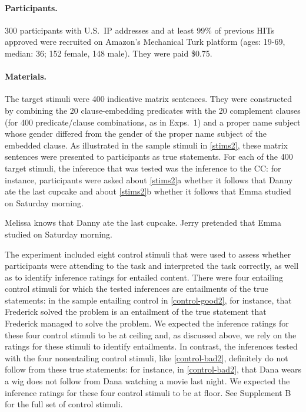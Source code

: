 \documentclass{language}
\newcommand{\6}{\mbox{$[\hspace*{-.6mm}[$}}
\newcommand{\9}{\mbox{$]\hspace*{-.6mm}]$}}
\begin{document}
\paragraph{Participants.} 300 participants with U.S.\ IP addresses and at least 99\% of previous HITs approved were recruited on Amazon's Mechanical Turk platform (ages: 19-69, median: 36; 152 female, 148 male). They were paid \$0.75.

\paragraph{Materials.} The target stimuli were 400 indicative matrix sentences. They were constructed by combining the 20 clause-embedding predicates with the 20 complement clauses (for 400 predicate/clause combinations, as in Exps.~1) and a proper name subject whose gender differed from the gender of the proper name subject of the embedded clause. As illustrated in the sample stimuli in \ref{stims2}, these matrix sentences were presented to participants as true statements. For each of the 400 target stimuli, the inference that was tested was the inference to the CC: for instance, participants were asked about \ref{stims2}a whether it follows that Danny ate the last cupcake and about \ref{stims2}b whether it follows that Emma studied on Saturday morning.

\begin{exe}
\ex\label{stims2}
\begin{xlist}
 Melissa knows that Danny ate the last cupcake.
 Jerry pretended that Emma studied on Saturday morning.
\end{xlist}
\end{exe}

The experiment included eight control stimuli that were used to assess whether participants were attending to the task and interpreted the task correctly, as well as to identify inference ratings for entailed content. There were four entailing control stimuli for which the tested inferences are entailments of the true statements: in the sample entailing control in \ref{control-good2}, for instance, that Frederick solved the problem is an entailment of the true statement that Frederick managed to solve the problem. We expected the inference ratings for these four control stimuli to be at ceiling and, as discussed above, we rely on the ratings for these stimuli to identify entailments. In contrast, the inferences tested with the four nonentailing control stimuli, like \ref{control-bad2}, definitely do not follow from these true statements: for instance, in \ref{control-bad2}, that Dana wears a wig does not follow from Dana watching a movie last night. We expected the inference ratings for these four control stimuli to be at floor. See Supplement B for the full set of control stimuli.
\end{document}
